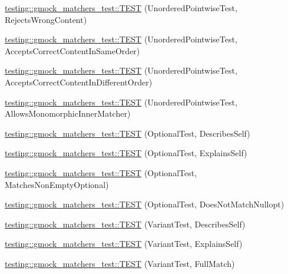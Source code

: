 \begin{DoxyCompactItemize}
\item 
\mbox{\hyperlink{namespacetesting_1_1gmock__matchers__test_a9a9a85c6598ab74463703acbd01aa1a7}{testing\+::gmock\+\_\+matchers\+\_\+test\+::\+T\+E\+ST}} (Unordered\+Pointwise\+Test, Rejects\+Wrong\+Content)
\item 
\mbox{\hyperlink{namespacetesting_1_1gmock__matchers__test_aa68bf48e4a8fa41fcd60f59cc60ede8f}{testing\+::gmock\+\_\+matchers\+\_\+test\+::\+T\+E\+ST}} (Unordered\+Pointwise\+Test, Accepts\+Correct\+Content\+In\+Same\+Order)
\item 
\mbox{\hyperlink{namespacetesting_1_1gmock__matchers__test_a3d48732b4a6069cfcf5c0dde6027dad5}{testing\+::gmock\+\_\+matchers\+\_\+test\+::\+T\+E\+ST}} (Unordered\+Pointwise\+Test, Accepts\+Correct\+Content\+In\+Different\+Order)
\item 
\mbox{\hyperlink{namespacetesting_1_1gmock__matchers__test_af16d28a9f3a07b8ef2962b868b4f8399}{testing\+::gmock\+\_\+matchers\+\_\+test\+::\+T\+E\+ST}} (Unordered\+Pointwise\+Test, Allows\+Monomorphic\+Inner\+Matcher)
\item 
\mbox{\hyperlink{namespacetesting_1_1gmock__matchers__test_af95ffc596bae2c2d552080210cc2d75e}{testing\+::gmock\+\_\+matchers\+\_\+test\+::\+T\+E\+ST}} (Optional\+Test, Describes\+Self)
\item 
\mbox{\hyperlink{namespacetesting_1_1gmock__matchers__test_a4a09099193a53ab3e83fad7062bfdff0}{testing\+::gmock\+\_\+matchers\+\_\+test\+::\+T\+E\+ST}} (Optional\+Test, Explains\+Self)
\item 
\mbox{\hyperlink{namespacetesting_1_1gmock__matchers__test_aa763f9478bee483d8b218803117693c1}{testing\+::gmock\+\_\+matchers\+\_\+test\+::\+T\+E\+ST}} (Optional\+Test, Matches\+Non\+Empty\+Optional)
\item 
\mbox{\hyperlink{namespacetesting_1_1gmock__matchers__test_aa3ff7bcbfff3bd7c1b0db8c910637482}{testing\+::gmock\+\_\+matchers\+\_\+test\+::\+T\+E\+ST}} (Optional\+Test, Does\+Not\+Match\+Nullopt)
\item 
\mbox{\hyperlink{namespacetesting_1_1gmock__matchers__test_a97d781c5c0c52c5e189b2211714957b7}{testing\+::gmock\+\_\+matchers\+\_\+test\+::\+T\+E\+ST}} (Variant\+Test, Describes\+Self)
\item 
\mbox{\hyperlink{namespacetesting_1_1gmock__matchers__test_a61087a1b752685744cc31e2e459aa9e7}{testing\+::gmock\+\_\+matchers\+\_\+test\+::\+T\+E\+ST}} (Variant\+Test, Explains\+Self)
\item 
\mbox{\hyperlink{namespacetesting_1_1gmock__matchers__test_afacaf5f72c4160e1b01c8db4dd116d81}{testing\+::gmock\+\_\+matchers\+\_\+test\+::\+T\+E\+ST}} (Variant\+Test, Full\+Match)

\end{DoxyCompactItemize}
